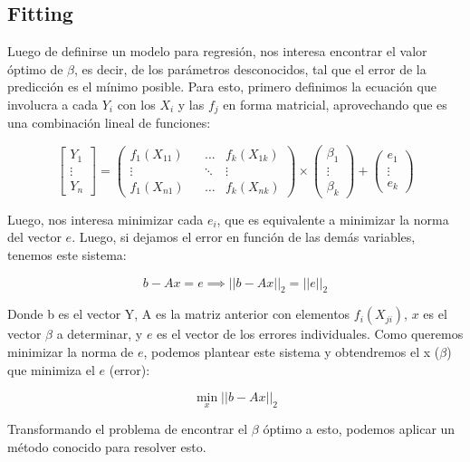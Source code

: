 \subsection{Fitting}
    
    Luego de definirse un modelo para regresión, nos interesa encontrar el valor óptimo de $\beta$, es decir, de los parámetros desconocidos, tal que el error de la predicción es el mínimo posible. Para esto, primero definimos la ecuación que involucra a cada $Y_i$ con los $X_i$ y las $f_j$ en forma matricial, aprovechando que es una combinación lineal de funciones:
    
    \begin{equation}
\begin{bmatrix}
 Y_1 \\ \vdots \\ Y_{n} 
 \end{bmatrix}
 =
 \begin{pmatrix}
  f_1(X_{11}) && \ldots & f_k(X_{1k}) \\
  \vdots && \ddots & \vdots \\
  f_1(X_{n1}) && \ldots & f_k(X_{nk})
  \end{pmatrix}
  \times
  \begin{pmatrix}
  \beta_1 \\ \vdots \\ \beta_k
  \end{pmatrix}
  +
  \begin{pmatrix}
  e_1 \\ \vdots \\ e_k
  \end{pmatrix}
\end{equation}
    
    Luego, nos interesa minimizar cada $e_i$, que es equivalente a minimizar la norma del vector $e$. Luego, si dejamos el error en función de las demás variables, tenemos este sistema:
    
    \[ b - Ax = e  \implies ||b - Ax||_2 = ||e||_2 \]
    
    Donde b es el vector Y, A es la matriz anterior con elementos $f_i(X_{ji})$, $x$ es el vector $\beta$ a determinar, y $e$ es el vector de los errores individuales. Como queremos minimizar la norma de $e$, podemos plantear este sistema y obtendremos el x ($\beta$) que minimiza el $e$ (error):
    
    \[ \min_x  ||b - Ax||_2\]
    
    Transformando el problema de encontrar el $\beta$ óptimo a esto, podemos aplicar un método conocido para resolver esto.
    
